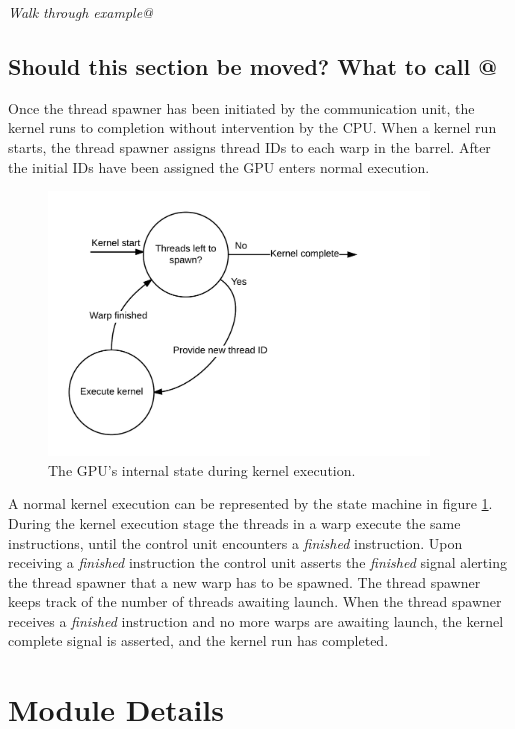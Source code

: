 \documentclass[../main/report.tex]{subfiles}
\begin{document}
\emph{Walk through example@}


\subsection{Should this section be moved? What to call @}

Once the thread spawner has been initiated by the communication unit, the kernel runs to completion without intervention by the CPU. 
When a kernel run starts, the thread spawner assigns thread IDs to each warp in the barrel.
After the initial IDs have been assigned the GPU enters normal execution.
\begin{figure}[H]
    \centering
    \includegraphics[width=0.9\textwidth]{../gpu/diagrams/kernel_run_state_machine.png}
    \caption{The GPU's internal state during kernel execution.}
    \label{fig:kernel_run_state_machine}
\end{figure}
A normal kernel execution can be represented by the state machine in figure \ref{fig:kernel_run_state_machine}.
During the kernel execution stage the threads in a warp execute the same instructions, until the control unit encounters a \emph{finished} instruction.
Upon receiving a \emph{finished} instruction the control unit asserts the \emph{finished} signal alerting the thread spawner that a new warp has to be spawned.
The thread spawner keeps track of the number of threads awaiting launch.
When the thread spawner receives a \emph{finished} instruction and no more warps are awaiting launch, the kernel complete signal is asserted, and the kernel run has completed.


\section{Module Details}
\end{document}
